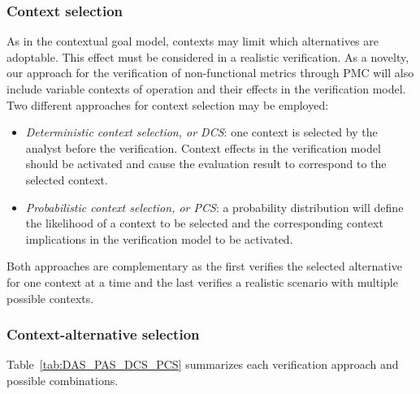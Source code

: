 
\subsubsection{Context selection}

As in the contextual goal model, contexts may limit which alternatives are adoptable. This effect must be considered in a realistic verification. As a novelty, our approach for the verification of non-functional metrics through PMC will also include variable contexts of operation and their effects in the verification model. Two different approaches for context selection may be employed: 

\begin{itemize}

\item \textit{Deterministic context selection, or DCS}: one context is selected by the analyst before the verification. Context effects in the verification model should be activated and cause the evaluation result to correspond to the selected context.
\medskip

\item \textit{Probabilistic context selection, or PCS}: a probability distribution will define the likelihood of a context to be selected and the corresponding context implications in the verification model to be activated.  

\end{itemize}

Both approaches are complementary as the first verifies the selected alternative for one context at a time and the last verifies a realistic scenario with multiple possible contexts. 

\subsubsection{Context-alternative selection}

Table~\ref{tab:DAS_PAS_DCS_PCS} summarizes each verification approach and possible combinations.

